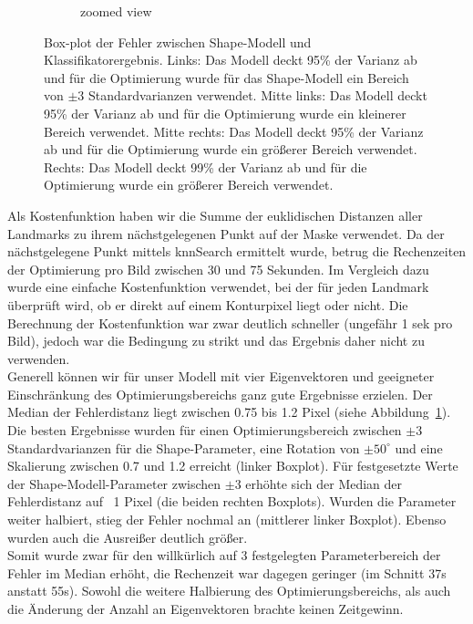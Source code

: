 \documentclass[]{report}
\begin{document}
\begin{enumerate}
\begin{enumerate}
\begin{figure}
\begin{subfigure}[t]{0.48\textwidth}
						\caption{zoomed view}
					\end{subfigure}
					\caption{Box-plot der Fehler zwischen Shape-Modell und Klassifikatorergebnis. Links: Das Modell deckt 95\% der Varianz ab und für die Optimierung wurde für das Shape-Modell ein Bereich von $\pm3$ Standardvarianzen verwendet. Mitte links: Das Modell deckt 95\% der Varianz ab und für die Optimierung wurde ein kleinerer Bereich verwendet. Mitte rechts: Das Modell deckt 95\% der Varianz ab und für die Optimierung wurde ein größerer Bereich verwendet. Rechts: Das Modell deckt 99\% der Varianz ab und für die Optimierung wurde ein größerer Bereich verwendet.}
					\label{fig:box4S4L9L}
				\end{figure}
				Als Kostenfunktion haben wir die Summe der euklidischen Distanzen aller Landmarks zu ihrem nächstgelegenen Punkt auf der Maske verwendet. Da der nächstgelegene Punkt mittels knnSearch ermittelt wurde, betrug die Rechenzeiten der Optimierung pro Bild zwischen 30 und 75 Sekunden. Im Vergleich dazu wurde eine einfache Kostenfunktion verwendet, bei der für jeden Landmark überprüft wird, ob er direkt auf einem Konturpixel liegt oder nicht. Die Berechnung der Kostenfunktion war zwar deutlich schneller (ungefähr 1 sek pro Bild), jedoch war die Bedingung zu strikt und das Ergebnis daher nicht zu verwenden.\\
				
				Generell können wir für unser Modell mit vier Eigenvektoren und geeigneter Einschränkung des Optimierungsbereichs ganz gute Ergebnisse erzielen. Der Median der Fehlerdistanz liegt zwischen 0.75 bis 1.2 Pixel (siehe Abbildung~\ref{fig:box4S4L9L}). Die besten Ergebnisse wurden für einen Optimierungsbereich zwischen $\pm3$ Standardvarianzen für die Shape-Parameter, eine Rotation von $\pm50^\circ$ und eine Skalierung zwischen 0.7 und 1.2 erreicht (linker Boxplot). Für festgesetzte Werte der Shape-Modell-Parameter zwischen $\pm3$ erhöhte sich der Median der Fehlerdistanz auf ~1 Pixel (die beiden rechten Boxplots). Wurden die Parameter weiter halbiert, stieg der Fehler nochmal an (mittlerer linker Boxplot). Ebenso wurden auch die Ausreißer deutlich größer.\\
				Somit wurde zwar für den willkürlich auf 3 festgelegten Parameterbereich der Fehler im Median erhöht, die Rechenzeit war dagegen geringer (im Schnitt 37s anstatt 55s). Sowohl die weitere Halbierung des Optimierungsbereichs, als auch die Änderung der Anzahl an Eigenvektoren brachte keinen Zeitgewinn.\\
				
			\end{enumerate}
			
	\end{enumerate}
	
\end{document}
